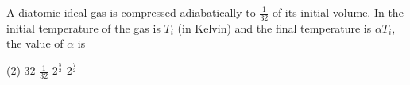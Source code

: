 
\item A diatomic ideal gas is compressed adiabatically to $\frac{1}{32}$ of its initial volume. In the initial temperature of the gas is $T_i$ (in Kelvin) and the final temperature is $\alpha T_i$, the value of $\alpha$ is
\begin{tasks}(2)
    \task $32$
    \task $\frac{1}{32}$
    \task $2^{\frac{5}{2}}$
    \task $2^{\frac{7}{2}}$\ans
\end{tasks}
